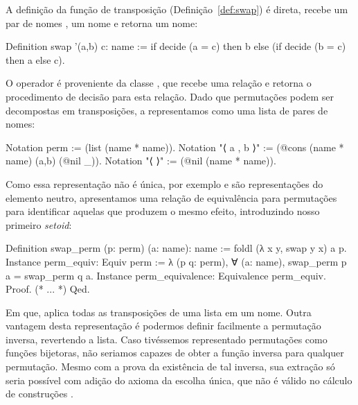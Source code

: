 A definição da função de transposição (Definição~\ref{def:swap}) é direta, recebe um par de nomes , um nome  e retorna um nome:
\begin{coqcode}
Definition swap '(a,b) c: name :=
   if decide (a = c) then b else (if decide (b = c) then a else c).
\end{coqcode}
O operador  é proveniente da classe , que recebe uma relação e retorna o procedimento de decisão para esta relação. 
Dado que permutações podem ser decompostas em transposições, a representamos como uma lista de pares de nomes:
\begin{coqcode}
Notation perm := (list (name * name)).
Notation "⟨ a , b ⟩" := (@cons (name * name) (a,b) (@nil _)).
Notation "⟨ ⟩" := (@nil (name * name)).
\end{coqcode}
Como essa representação não é única, por exemplo  e  são representações do elemento neutro, apresentamos uma relação de equivalência para permutações para identificar aquelas que produzem o mesmo efeito, introduzindo nosso primeiro \textit{setoid}:
\begin{coqcode}
Definition swap_perm (p: perm) (a: name): name :=
   foldl (λ x y, swap y x) a p.
Instance perm_equiv: Equiv perm :=
   λ (p q: perm), ∀ (a: name), swap_perm p a = swap_perm q a.
Instance perm_equivalence: Equivalence perm_equiv. Proof. (* ... *) Qed.
\end{coqcode}
Em que,  aplica todas as transposições de uma lista em um nome. Outra vantagem desta representação é podermos definir facilmente a permutação inversa, revertendo a lista. Caso tivéssemos representado permutações como funções bijetoras, não seriamos capazes de obter a função inversa para qualquer permutação. Mesmo com a prova da existência de tal inversa, sua extração só seria possível com adição do axioma da escolha única, que não é válido no cálculo de construções \cite{Maietti2017}.

